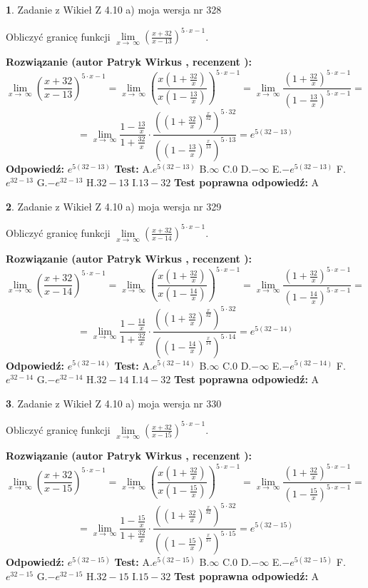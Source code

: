 \documentclass[12pt, a4paper]{article}
\theoremstyle{definition} %
\newtheorem{zad}{}
\newcommand{\zadStart}[1]{\begin{zad}#1\newline}
\newcommand{\zadStop}{\end{zad}}
\newcommand{\rozwStart}[2]{\noindent \textbf{Rozwiązanie (autor #1 , recenzent #2): }\newline}
\newcommand{\rozwStop}{\newline}
\newcommand{\odpStart}{\noindent \textbf{Odpowiedź:}\newline}
\newcommand{\odpStop}{\newline}
\newcommand{\testStart}{\noindent \textbf{Test:}\newline}
\newcommand{\testStop}{\newline}
\newcommand{\kluczStart}{\noindent \textbf{Test poprawna odpowiedź:}\newline}
\newcommand{\kluczStop}{\newline}
\begin{document}
\zadStart{Zadanie z Wikieł Z 4.10 a) moja wersja nr 328}


Obliczyć granicę funkcji  $\lim\limits_{x\to\ \infty}(\frac{x+32}{x-13})^{5\cdot x-1}$.
\zadStop
\rozwStart{Patryk Wirkus}{}
$$\lim\limits_{x\to\ \infty}(\frac{x+32}{x-13})^{5\cdot x-1} = \lim\limits_{x\to\ \infty}(\frac{x(1+\frac{32}{x})}{x(1-\frac{13}{x})})^{5\cdot x-1}=\lim\limits_{x\to\ \infty}\frac{(1+\frac{32}{x})^{5\cdot x-1}}{(1-\frac{13}{x})^{5\cdot x-1}}=$$
$$=\lim\limits_{x\to\ \infty}\frac{1-\frac{13}{x}}{1+\frac{32}{x}}\cdot\frac{((1+\frac{32}{x})^{\frac{x}{32}})^{5\cdot32}}{((1-\frac{13}{x})^{\frac{x}{13}})^{5\cdot13}}=e^{5(32-13)}$$
\rozwStop
\odpStart
$e^{5(32-13)}$
\odpStop
\testStart
A.$e^{5(32-13)}$ B.$\infty$ C.$0$ D.$-\infty$ E.$-e^{5(32-13)}$
F.$e^{32-13}$ G.$-e^{32-13}$
H.$32-13$
I.$13-32$
\testStop
\kluczStart
A
\kluczStop



\zadStart{Zadanie z Wikieł Z 4.10 a) moja wersja nr 329}


Obliczyć granicę funkcji  $\lim\limits_{x\to\ \infty}(\frac{x+32}{x-14})^{5\cdot x-1}$.
\zadStop
\rozwStart{Patryk Wirkus}{}
$$\lim\limits_{x\to\ \infty}(\frac{x+32}{x-14})^{5\cdot x-1} = \lim\limits_{x\to\ \infty}(\frac{x(1+\frac{32}{x})}{x(1-\frac{14}{x})})^{5\cdot x-1}=\lim\limits_{x\to\ \infty}\frac{(1+\frac{32}{x})^{5\cdot x-1}}{(1-\frac{14}{x})^{5\cdot x-1}}=$$
$$=\lim\limits_{x\to\ \infty}\frac{1-\frac{14}{x}}{1+\frac{32}{x}}\cdot\frac{((1+\frac{32}{x})^{\frac{x}{32}})^{5\cdot32}}{((1-\frac{14}{x})^{\frac{x}{14}})^{5\cdot14}}=e^{5(32-14)}$$
\rozwStop
\odpStart
$e^{5(32-14)}$
\odpStop
\testStart
A.$e^{5(32-14)}$ B.$\infty$ C.$0$ D.$-\infty$ E.$-e^{5(32-14)}$
F.$e^{32-14}$ G.$-e^{32-14}$
H.$32-14$
I.$14-32$
\testStop
\kluczStart
A
\kluczStop



\zadStart{Zadanie z Wikieł Z 4.10 a) moja wersja nr 330}


Obliczyć granicę funkcji  $\lim\limits_{x\to\ \infty}(\frac{x+32}{x-15})^{5\cdot x-1}$.
\zadStop
\rozwStart{Patryk Wirkus}{}
$$\lim\limits_{x\to\ \infty}(\frac{x+32}{x-15})^{5\cdot x-1} = \lim\limits_{x\to\ \infty}(\frac{x(1+\frac{32}{x})}{x(1-\frac{15}{x})})^{5\cdot x-1}=\lim\limits_{x\to\ \infty}\frac{(1+\frac{32}{x})^{5\cdot x-1}}{(1-\frac{15}{x})^{5\cdot x-1}}=$$
$$=\lim\limits_{x\to\ \infty}\frac{1-\frac{15}{x}}{1+\frac{32}{x}}\cdot\frac{((1+\frac{32}{x})^{\frac{x}{32}})^{5\cdot32}}{((1-\frac{15}{x})^{\frac{x}{15}})^{5\cdot15}}=e^{5(32-15)}$$
\rozwStop
\odpStart
$e^{5(32-15)}$
\odpStop
\testStart
A.$e^{5(32-15)}$ B.$\infty$ C.$0$ D.$-\infty$ E.$-e^{5(32-15)}$
F.$e^{32-15}$ G.$-e^{32-15}$
H.$32-15$
I.$15-32$
\testStop
\kluczStart
A
\kluczStop
\end{document}
